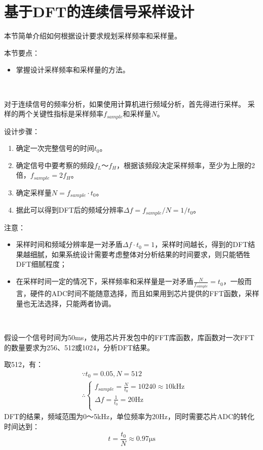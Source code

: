 \section{基于DFT的连续信号采样设计}

本节简单介绍如何根据设计要求规划采样频率和采样量。

本节要点：
\begin{itemize}
    \item 掌握设计采样频率和采样量的方法。
\end{itemize}

~

对于连续信号的频率分析，如果使用计算机进行频域分析，首先得进行采样。
采样的两个关键性指标是采样频率$f_{sample}$和采样量$N$。

设计步骤：
\begin{enumerate}
    \item 确定一次完整信号的时间$t_0$。
    \item 确定信号中要考察的频段$f_L\text{～}f_H$，根据该频段决定采样频率，至少为上限的2倍，$f_{sample}=2f_H$。
    \item 确定采样量$N=f_{sample}\cdot t_0$。
    \item 据此可以得到DFT后的频域分辨率$\Delta f=f_{sample}/N=1/t_0$。
\end{enumerate}

注意：
\begin{itemize}
    \item 采样时间和频域分辨率是一对矛盾$\Delta f\cdot t_0=1$，采样时间越长，得到的DFT结果越细腻，如果系统设计需要考虑整体对分析结果的时间要求，则只能牺牲DFT细腻程度；
    \item 在采样时间一定的情况下，采样频率和采样量是一对矛盾$\frac{N}{f_{sample}}=t_0$，一般而言，硬件的ADC时间不能随意选择，而且如果用到芯片提供的FFT函数，采样量也无法选择，只能两者协调。
\end{itemize}

~

\begin{example}
假设一个信号时间为50ms，使用芯片开发包中的FFT库函数，库函数对一次FFT的数量要求为256、512或1024，分析DFT结果。
\end{example}

取512，有：
\begin{align*}
&\because t_0=0.05,N=512 \\
&\therefore \begin{cases}
	f_{sample}=\frac{N}{t_0}=10240\approx 10\mathrm{kHz}\\
	\Delta f=\frac{1}{t_0}=20\mathrm{Hz}\\
\end{cases}
\end{align*}
DFT的结果，频域范围为0～5kHz，单位频率为20Hz，同时需要芯片ADC的转化时间达到：
\[
t=\frac{t_0}{N}\approx 0.97\mathrm{\mu s}
\]




